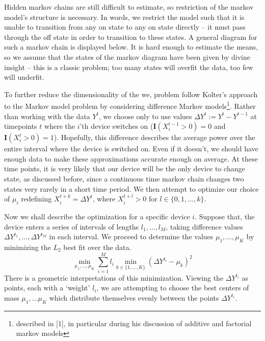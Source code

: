 \documentclass{article}
\begin{document}
Hidden markov chains are still difficult to estimate, so restriction of the markov model's structure is necessary. In words, we restrict the model such that it is unable to transition from any on state to any on state directly -- it must pass through the off state in order to transition to these states. A general diagram for such a markov chain is displayed below. It is hard enough to estimate the means, so we assume that the states of the markov diagram have been given by divine insight -- this is a classic problem; too many states will overfit the data, too few will underfit.

To further reduce the dimensionality of the we, problem follow Kolter's approach to the Markov model problem by considering difference Markov models\footnote{described in [1], in particular during his discussion of additive and factorial markov models}. Rather than working with the data $Y^t$, we choose only to use values $\Delta Y^t := Y^t - Y^{t-1}$ at timepoints $t$ where the $i$'th device switches on ($\mathbf{I}(X_i^{t-1} > 0) = 0$ and $\mathbf{I}(X_i^t > 0) = 1$). Hopefully, this difference describes the average power over the entire interval where the device is switched on. Even if it doesn't, we should have enough data to make these approximations accurate enough on average. At these time points, it is very likely that our device will be the only device to change state, as discussed before, since a continuous time markov chain changes two states very rarely in a short time period. We then attempt to optimize our choice of $\mu_i$ redefining $X_i^{t + k} = \Delta Y^t$, where $X_i^{t + l} > 0$ for $l \in \{0, 1, \dots, k\}$.

Now we shall describe the optimization for a specific device $i$. Suppose that, the device enters a series of intervals of lengths $l_1, \dots, l_M$, taking difference values $\Delta Y^{t_1}, \dots, \Delta Y^{t_M}$ in each interval. We proceed to determine the values $\mu_1, \dots, \mu_K$ by minimizing the $L_2$ best fit over the data.
%
\begin{equation} \min_{\mu_1, \dots, \mu_K} \sum_{i = 1}^M l_i \min_{k \in \{ 1, \dots, K \}}(\Delta Y^{t_i} - \mu_k)^2 \end{equation}
%
There is a geometric interpretations of this minimization. Viewing the $\Delta Y^{t_i}$ as points, each with a `weight' $l_i$, we are attempting to choose the best centers of mass $\mu_1, \dots \mu_K$ which distribute themselves evenly between the points $\Delta Y^{t_i}$.
\end{document}
